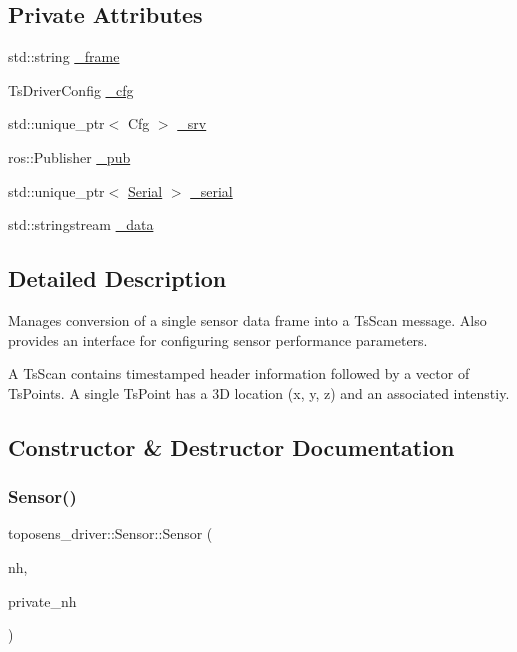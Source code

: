 \subsection*{Private Attributes}
\begin{DoxyCompactItemize}
\item 
std\+::string \hyperlink{classtoposens__driver_1_1Sensor_ae860cfd52f61f29d80bc086aa722a749}{\+\_\+frame}
\item 
Ts\+Driver\+Config \hyperlink{classtoposens__driver_1_1Sensor_a9542d24036f53f0aebc872554a3802af}{\+\_\+cfg}
\item 
std\+::unique\+\_\+ptr$<$ Cfg $>$ \hyperlink{classtoposens__driver_1_1Sensor_a02f9c1b78374f7958c14260e9fecac70}{\+\_\+srv}
\item 
ros\+::\+Publisher \hyperlink{classtoposens__driver_1_1Sensor_ac18f0d9e465c022a615d526207ff84f3}{\+\_\+pub}
\item 
std\+::unique\+\_\+ptr$<$ \hyperlink{classtoposens__driver_1_1Serial}{Serial} $>$ \hyperlink{classtoposens__driver_1_1Sensor_a202083580774286223129fd84ead26af}{\+\_\+serial}
\item 
std\+::stringstream \hyperlink{classtoposens__driver_1_1Sensor_ad0906c5d74c1da808d26b62d03c54f8d}{\+\_\+data}
\end{DoxyCompactItemize}


\subsection{Detailed Description}
Manages conversion of a single sensor data frame into a Ts\+Scan message. Also provides an interface for configuring sensor performance parameters.

A Ts\+Scan contains timestamped header information followed by a vector of Ts\+Points. A single Ts\+Point has a 3D location (x, y, z) and an associated intenstiy. 

\subsection{Constructor \& Destructor Documentation}
\mbox{\label{classtoposens__driver_1_1Sensor_ab14040539bf943fcfb95d613ace04f80}} 
\subsubsection{\texorpdfstring{Sensor()}{Sensor()}}
{\footnotesize\ttfamily toposens\+\_\+driver\+::\+Sensor\+::\+Sensor (\begin{DoxyParamCaption}\item[{ros\+::\+Node\+Handle}]{nh,  }\item[{ros\+::\+Node\+Handle}]{private\+\_\+nh }\end{DoxyParamCaption})}


